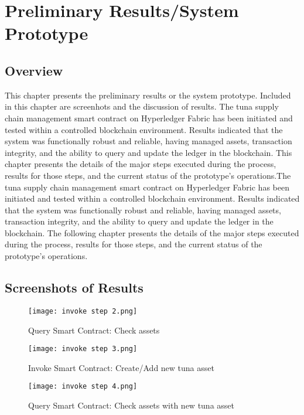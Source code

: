 \chapter{Preliminary Results/System Prototype}
\section{Overview}
This chapter  presents the preliminary results or the system prototype.  Included in this chapter are screenhots and the discussion of results. The tuna supply chain management smart contract on Hyperledger Fabric has been initiated and tested within a controlled blockchain environment. Results indicated that the system was functionally robust and reliable, having managed assets, transaction integrity, and the ability to query and update the ledger in the blockchain. This chapter presents the details of the major steps executed during the process, results for those steps, and the current status of the prototype's operations.The tuna supply chain management smart contract on Hyperledger Fabric has been initiated and tested within a controlled blockchain environment. Results indicated that the system was functionally robust and reliable, having managed assets, transaction integrity, and the ability to query and update the ledger in the blockchain. The following chapter presents the details of the major steps executed during the process, results for those steps, and the current status of the prototype's operations.

\section{Screenshots of Results}
\begin{figure}[H]
	\centering
	\texttt{[image: invoke step 2.png]}
	\caption{Query Smart Contract: Check assets}
	\label{fig: second step}
\end{figure}

\begin{figure}[H]
	\centering
	\texttt{[image: invoke step 3.png]}
	\caption{Invoke Smart Contract: Create/Add new tuna asset }
	\label{fig: third step}
\end{figure}

\begin{figure}[H]
	\centering
	\texttt{[image: invoke step 4.png]}
	\caption{Query Smart Contract: Check assets with new tuna asset}
	\label{fig: fourth step}
\end{figure}

